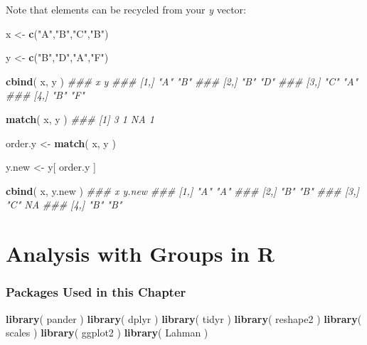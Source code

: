 \documentclass[]{book}
\newenvironment{Shaded}{\begin{snugshade}}{\end{snugshade}}
\newcommand{\CommentTok}[1]{\textcolor[rgb]{0.56,0.35,0.01}{\textit{#1}}}
\newcommand{\KeywordTok}[1]{\textcolor[rgb]{0.13,0.29,0.53}{\textbf{#1}}}
\newcommand{\NormalTok}[1]{#1}
\newcommand{\StringTok}[1]{\textcolor[rgb]{0.31,0.60,0.02}{#1}}
\theoremstyle{definition}
\theoremstyle{definition}
\theoremstyle{definition}
\theoremstyle{remark}
\begin{document}
Note that elements can be recycled from your \emph{y} vector:

\begin{Shaded}
\begin{Highlighting}[]

\NormalTok{x <-}\StringTok{ }\KeywordTok{c}\NormalTok{(}\StringTok{"A"}\NormalTok{,}\StringTok{"B"}\NormalTok{,}\StringTok{"C"}\NormalTok{,}\StringTok{"B"}\NormalTok{)}

\NormalTok{y <-}\StringTok{ }\KeywordTok{c}\NormalTok{(}\StringTok{"B"}\NormalTok{,}\StringTok{"D"}\NormalTok{,}\StringTok{"A"}\NormalTok{,}\StringTok{"F"}\NormalTok{)}

\KeywordTok{cbind}\NormalTok{( x, y )}
\CommentTok{###      x   y  }
\CommentTok{### [1,] "A" "B"}
\CommentTok{### [2,] "B" "D"}
\CommentTok{### [3,] "C" "A"}
\CommentTok{### [4,] "B" "F"}

\KeywordTok{match}\NormalTok{( x, y )}
\CommentTok{### [1]  3  1 NA  1}

\NormalTok{order.y <-}\StringTok{ }\KeywordTok{match}\NormalTok{( x, y )}

\NormalTok{y.new <-}\StringTok{ }\NormalTok{y[ order.y ]}

\KeywordTok{cbind}\NormalTok{( x, y.new )}
\CommentTok{###      x   y.new}
\CommentTok{### [1,] "A" "A"  }
\CommentTok{### [2,] "B" "B"  }
\CommentTok{### [3,] "C" NA   }
\CommentTok{### [4,] "B" "B"}
\end{Highlighting}
\end{Shaded}

\hypertarget{analysis-with-groups-in-r}{%
\chapter{Analysis with Groups in R}\label{analysis-with-groups-in-r}}

\hypertarget{packages-used-in-this-chapter-1}{%
\subsection{Packages Used in this
Chapter}\label{packages-used-in-this-chapter-1}}

\begin{Shaded}
\begin{Highlighting}[]

\KeywordTok{library}\NormalTok{( pander )}
\KeywordTok{library}\NormalTok{( dplyr )}
\KeywordTok{library}\NormalTok{( tidyr )}
\KeywordTok{library}\NormalTok{( reshape2 )}
\KeywordTok{library}\NormalTok{( scales )}
\KeywordTok{library}\NormalTok{( ggplot2 )}
\KeywordTok{library}\NormalTok{( Lahman )}
\end{Highlighting}
\end{Shaded}
\end{document}
